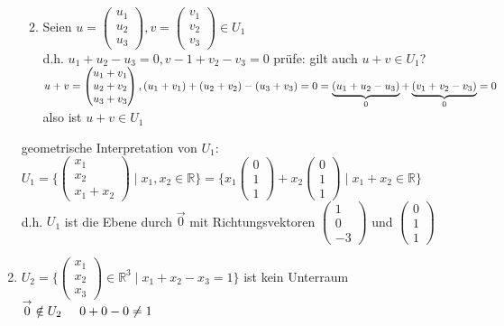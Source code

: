 \documentclass[a4paper,11pt]{article}
\begin{document}
\begin{enumerate}[label=\alph*)]
\begin{enumerate}[label=(\arabic*)]
\newpage
\item Seien $u=\begin{pmatrix}u_1\\u_2\\u_3\end{pmatrix}, v=\begin{pmatrix}v_1\\v_2\\v_3\end{pmatrix}\in U_1$ \\
d.h. $u_1+u_2-u_3=0, v-1+v_2-v_3=0$ prüfe: gilt auch $u+v\in U_1$? \\
$u+v=\begin{pmatrix}u_1+v_1\\u_2+v_2\\u_3+v_3\end{pmatrix}, (u_1+v_1)+(u_2+v_2)-(u_3+v_3)=0 \\
=\underbrace{(u_1+u_2-u_3)}_{0}+\underbrace{(v_1+v_2-v_3)}_{0}=0$ also ist $u+v\in U_1$
\end{enumerate}
geometrische Interpretation von $U_1$: \\
$U_1=\{\begin{pmatrix}x_1\\x_2\\x_1+x_2\end{pmatrix}\mid x_1,x_2\in\mathbb{R}\}=\{x_1\begin{pmatrix}0\\1\\1\end{pmatrix}+x_2\begin{pmatrix}0\\1\\1\end{pmatrix}\mid x_1+x_2\in\mathbb{R}\}$ \\
d.h. $U_1$ ist die Ebene durch $\overset{\rightarrow}{0}$ mit Richtungsvektoren $\begin{pmatrix}1\\0\\-3\end{pmatrix}$ und $\begin{pmatrix}0\\1\\1\end{pmatrix}$
\item $U_2=\{\begin{pmatrix}x_1\\x_2\\x_3\end{pmatrix}\in\mathbb{R}^3\mid x_1+x_2-x_3=1\}$ ist kein Unterraum\hspace{5mm}$\overset{\rightarrow}{0}\notin U_2\hspace{5mm}0+0-0\neq1$

\end{enumerate}
\end{document}
